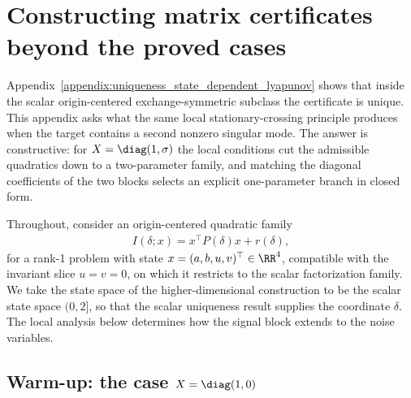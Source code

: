 \documentclass{article}
\begin{document}
%

\section{Constructing matrix certificates beyond the proved cases}
\label{appendix:state_dependent_higher_dim}

Appendix~\ref{appendix:uniqueness_state_dependent_lyapunov} shows that inside
the scalar origin-centered exchange-symmetric subclass the certificate is
unique. This appendix asks what the same local stationary-crossing principle
produces when the target contains a second nonzero singular mode. The answer
is constructive: for $X=\diag(1,\sigma)$ the local conditions cut the
admissible quadratics down to a two-parameter family, and matching the
diagonal coefficients of the two blocks selects an explicit one-parameter
branch in closed form.

Throughout, consider an origin-centered quadratic family
\begin{align}
    I(\delta; x) = x^\top P(\delta) x + r(\delta),
\end{align}
for a rank-1 problem with state $x=(a,b,u,v)^\top \in \RR^4$, compatible with
the invariant slice $u=v=0$, on which it restricts to the scalar
factorization family. We take the state space of the higher-dimensional
construction to be the scalar state space $(0,2]$, so that the scalar
uniqueness result supplies the coordinate $\delta$. The local analysis below
determines how the signal block extends to the noise variables.

\subsection{Warm-up: the case \texorpdfstring{$X=\diag(1,0)$}{X=diag(1,0)}}
\label{appendix:diag10_state_dependent_structure}
\end{document}

